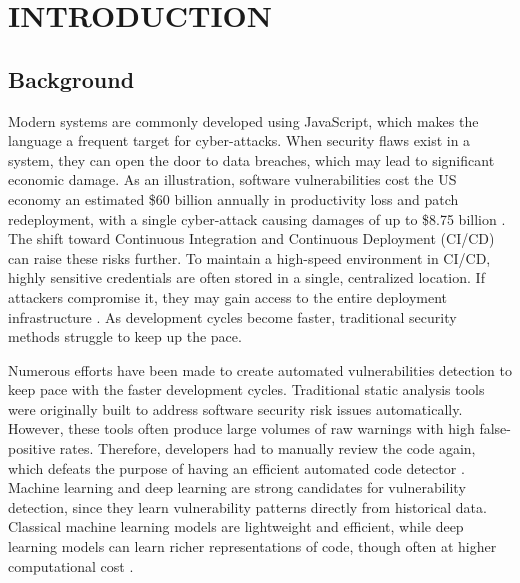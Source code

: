 \chapter{INTRODUCTION}

\section{Background}


Modern systems are commonly developed using JavaScript, which makes the language a frequent target for cyber-attacks. When security flaws exist in a system, they can open the door to data breaches, which may lead to significant economic damage. As an illustration, software vulnerabilities cost the US economy an estimated \$60 billion annually in productivity loss and patch redeployment, with a single cyber-attack causing damages of up to \$8.75 billion \citep{anwar_measuring_2020}. The shift toward Continuous Integration and Continuous Deployment (CI/CD) can raise these risks further. To maintain a high-speed environment in CI/CD, highly sensitive credentials are often stored in a single, centralized location. If attackers compromise it, they may gain access to the entire deployment infrastructure \citep{pan_ambush_2024}. As development cycles become faster, traditional security methods struggle to keep up the pace.

Numerous efforts have been made to create automated vulnerabilities detection to keep pace with the faster development cycles. Traditional static analysis tools were originally built to address software security risk issues automatically. However, these tools often produce large volumes of raw warnings with high false-positive rates. Therefore, developers had to manually review the code again, which defeats the purpose of having an efficient automated code detector \citep{cheirdari_analyzing_2018}. Machine learning and deep learning are strong candidates for vulnerability detection, since they learn vulnerability patterns directly from historical data. Classical machine learning models are lightweight and efficient, while deep learning models can learn richer representations of code, though often at higher computational cost \citep{harer_automated_2018}.

